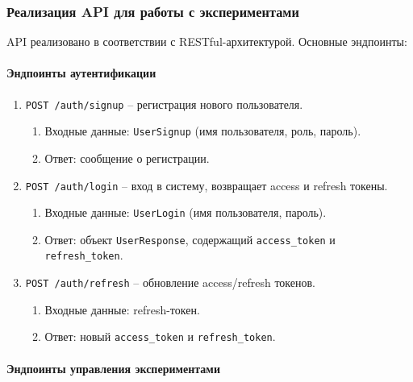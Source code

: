 \subsubsection{Реализация API для работы с экспериментами}

API реализовано в соответствии с RESTful-архитектурой. Основные эндпоинты:

\paragraph{Эндпоинты аутентификации}

\begin{enumerate}
    \item \texttt{POST /auth/signup} -- регистрация нового пользователя.
    \begin{enumerate}[label=\arabic{enumi}.\arabic*.]
        \item Входные данные: \texttt{UserSignup} (имя пользователя, роль, пароль).
        \item Ответ: сообщение о регистрации.
    \end{enumerate}

    \item \texttt{POST /auth/login} -- вход в систему, возвращает access и refresh токены.
    \begin{enumerate}[label=\arabic{enumi}.\arabic*.]
        \item Входные данные: \texttt{UserLogin} (имя пользователя, пароль).
        \item Ответ: объект \texttt{UserResponse}, содержащий \texttt{access\_token} и \texttt{refresh\_token}.
    \end{enumerate}

    \item \texttt{POST /auth/refresh} -- обновление access/refresh токенов.
    \begin{enumerate}[label=\arabic{enumi}.\arabic*.]
        \item Входные данные: refresh-токен.
        \item Ответ: новый \texttt{access\_token} и \texttt{refresh\_token}.
    \end{enumerate}
\end{enumerate}

\paragraph{Эндпоинты управления экспериментами}

